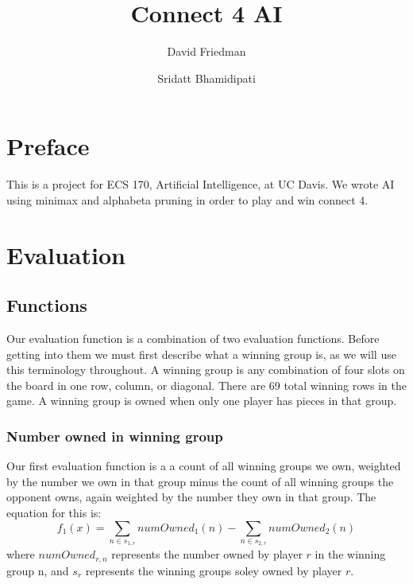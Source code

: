 \documentclass{article}
\title{Connect 4 AI}
\author{David Friedman \and Sridatt Bhamidipati}
\begin{document}
\maketitle
\newpage
\tableofcontents
\newpage

\section{Preface}
This is a project for ECS 170, Artificial Intelligence, at UC Davis. We wrote AI using minimax and alphabeta pruning in order to play and win connect 4.
	
\section{Evaluation}
\subsection{Functions}
Our evaluation function is a combination of two evaluation functions. Before getting into them we must first describe what a winning group is, as we will use this terminology throughout. A winning group is any combination of four slots on the board in one row, column, or diagonal. There are 69 total winning rows in the game. A winning group is owned when only one player has pieces in that group.
\subsubsection{Number owned in winning group}
Our first evaluation function is a a count of all winning groups we own, weighted by the number we own in that group minus the count of all winning groups the opponent owns, again weighted by the number they own in that group. The equation for this is:
\[f_1(x)=\sum_{n \in s_{1,r}}{numOwned_1(n)}-\sum_{n \in s_{2,r}}{numOwned_2(n)}\]
where $numOwned_{r,n}$ represents the number owned by player $r$ in the winning group n, and $s_r$ represents the winning groups soley owned by player $r$.
\end{document}
